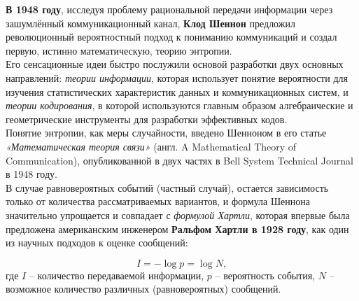 \textbf{В 1948 году}, исследуя проблему рациональной передачи информации через зашумлённый коммуникационный канал, \textbf{Клод Шеннон} предложил революционный вероятностный подход к пониманию коммуникаций и создал первую, истинно математическую, теорию энтропии. 
\\


Его сенсационные идеи быстро послужили основой разработки двух основных направлений: \textit{теории информации}, которая использует понятие вероятности для изучения статистических характеристик данных и коммуникационных систем, и \textit{теории кодирования}, в которой используются главным образом алгебраические и геометрические инструменты для разработки эффективных кодов.
\\


Понятие энтропии, как меры случайности, введено Шенноном в его статье \textit{«Математическая теория связи»} (англ. A Mathematical Theory of Communication), опубликованной в двух частях в Bell System Technical Journal в 1948 году.
\\


В случае равновероятных событий (частный случай), остается зависимость только от количества рассматриваемых вариантов, и формула Шеннона значительно упрощается и совпадает с \textit{формулой Хартли}, которая впервые была предложена американским инженером \textbf{Ральфом Хартли в 1928 году}, как один из научных подходов к оценке сообщений:

\[I=-\log p = \log N ,\]
где $I$ – количество передаваемой информации, $p$ – вероятность события, $N$ – возможное количество различных (равновероятных) сообщений.